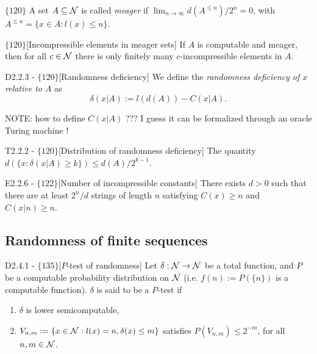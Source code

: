 \documentclass{article}
\begin{document}
$\{120\}$ A set $A \subseteq \mathcal{N}$ is called \textit{meager} if $\lim_{n \to \infty} d(A^{\leq n})/2^n = 0$, with $A^{\leq n} = \{x \in A: l(x) \leq n\}$.
\begin{flexilemma}{$\{120\}$}[Incompressible elements in meager sets]
    If $A$ is computable and meager, then for all $c \in \mathcal{N}$ there is only finitely many $c$-incompressible elements in $A$.
\end{flexilemma}

\begin{flexidefinition}{D2.2.3 - $\{120\}$}[Randomness deficiency] We define the \textit{randomness deficiency of $x$ relative to $A$} as \begin{equation}
    \delta(x|A) := l(d(A)) - C(x|A).
\end{equation}
\end{flexidefinition}

NOTE: how to define $C(x|A)$ ??? I guess it can be formalized through an oracle Turing machine !

\begin{flexitheorem}{T2.2.2 - $\{120\}$}[Distribution of randomness deficiency]
    The quantity $d(\{x: \delta(x|A) \geq k \}) \leq d(A)/2^{k-1}$.
\end{flexitheorem}

\begin{flexitheorem}{E2.2.6 - $\{122\}$}[Number of incompressible constants]
    There exists $d > 0$ such that there are at least $2^n / d$ strings of length $n$ satisfying $C(x) \geq n$ and $C(x|n) \geq n$.
\end{flexitheorem}

\subsection{Randomness of finite sequences}

\begin{flexidefinition}{D2.4.1 - $\{135\}$}[$P$-test of randomness]
    Let $\delta : \mathcal{N} \to \mathcal{N}$ be a total function, and $P$ be a computable probability distribution on $\mathcal{N}$ (i.e. $f(n) := P(\{n\})$ is a computable function). $\delta$ is said to be  a $P$-test if
    \begin{enumerate}[label = (\alph*)]
        \item $\delta$ is lower semicomputable,
        \item $V_{n,m} := \{x \in \mathcal{N} : l(x) = n, \delta(x) \leq m \}$ satisfies $P(V_{n,m}) \leq 2^{-m}$, for all $n,m \in \mathcal{N}$.
    \end{enumerate}
\end{flexidefinition}
\end{document}

